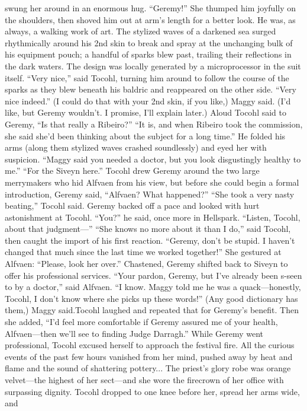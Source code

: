 \documentclass[9pt]{article}
\begin{document}
swung her around in an enormous hug. “Geremy!” She thumped him joyfully on the shoulders, then
shoved him out at arm’s length for a better look.
He was, as always, a walking work of art. The stylized waves of a darkened sea surged rhythmically
around his 2nd skin to break and spray at the unchanging bulk of his equipment pouch; a handful of
sparks blew past, trailing their reflections in the dark waters. The design was locally generated by a
microprocessor in the suit itself.
“Very nice,” said Tocohl, turning him around to follow the course of the sparks as they blew beneath
his baldric and reappeared on the other side. “Very nice indeed.”
(I could do that with your 2nd skin, if you like,) Maggy said.
(I’d like, but Geremy wouldn’t. I promise, I’ll explain later.) Aloud Tocohl said to Geremy, “Is that
really a Ribeiro?”
“It is, and when Ribeiro took the commission, she said she’d been thinking about the subject for a
long time.” He folded his arms (along them stylized waves crashed soundlessly) and eyed her with
suspicion. “Maggy said you needed a doctor, but you look disgustingly healthy to me.”
“For the Siveyn here.” Tocohl drew Geremy around the two large merrymakers who hid Alfvaen
from his view, but before she could begin a formal introduction, Geremy said, “Alfvaen? What
happened?”
“She took a very nasty beating,” Tocohl said.
Geremy backed off a pace and looked with hurt astonishment at Tocohl. “You?” he said, once more
in Hellspark. “Listen, Tocohl, about that judgment—”
“She knows no more about it than I do,” said Tocohl, then caught the import of his first reaction.
“Geremy, don’t be stupid. I haven’t changed that much since the last time we worked together!” She
gestured at Alfvaen: “Please, look her over.”
Chastened, Geremy shifted back to Siveyn to offer his professional services.
“Your pardon, Geremy, but I’ve already been s-seen to by a doctor,” said Alfvaen.
“I know. Maggy told me he was a quack—honestly, Tocohl, I don’t know where she picks up these
words!”
(Any good dictionary has them,) Maggy said.Tocohl laughed and repeated that for Geremy’s benefit. Then she added, “I’d feel more comfortable
if Geremy assured me of your health, Alfvaen—then we’ll see to finding Judge Darragh.”
While Geremy went professional, Tocohl excused herself to approach the festival fire. All the curious
events of the past few hours vanished from her mind, pushed away by heat and flame and the sound of
shattering pottery...
The priest’s glory robe was orange velvet—the highest of her sect—and she wore the firecrown of
her office with surpassing dignity. Tocohl dropped to one knee before her, spread her arms wide, and
\end{document}
